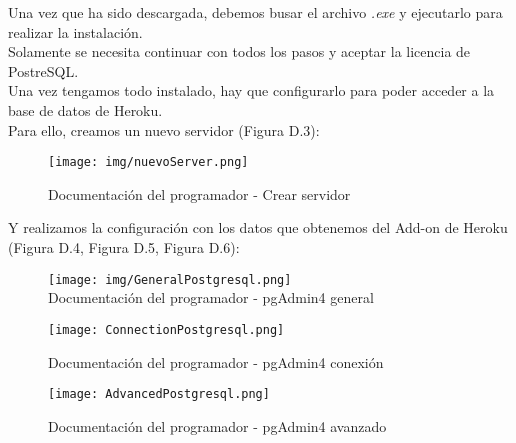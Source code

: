 Una vez que ha sido descargada, debemos busar el archivo \textit{.exe} y ejecutarlo para realizar la instalación.\\
Solamente se necesita continuar con todos los pasos y aceptar la licencia de PostreSQL.\\
Una vez tengamos todo instalado, hay que configurarlo para poder acceder a la base de datos de Heroku.\\
Para ello, creamos un nuevo servidor (Figura D.3):
\begin{figure}[h!]
    \centering
    \texttt{[image: img/nuevoServer.png]}
    \caption{Documentación del programador - Crear servidor}
    \label{Documentación del programador - Crear servidor}
\end{figure}


Y realizamos la configuración con los datos que obtenemos del Add-on de Heroku (Figura D.4, Figura D.5, Figura D.6):\\
\begin{figure}[H]
    \hspace{0.2cm}
    \begin{minipage}[b]{0.3\linewidth}
        \centering
        \texttt{[image: img/GeneralPostgresql.png]} \\
        \caption{Documentación del programador - pgAdmin4 general}
        \label{Documentación del programador - pgAdmin4 general}
    \end{minipage}
    \hspace{0.2cm}
    \begin{minipage}[b]{0.3\linewidth}
        \centering
        \texttt{[image: ConnectionPostgresql.png]}
        \caption{Documentación del programador - pgAdmin4 conexión}
        \label{Documentación del programador - pgAdmin4 conexión}
    \end{minipage}
    \hspace{0.2cm}
    \begin{minipage}[b]{0.3\linewidth}
        \centering
        \texttt{[image: AdvancedPostgresql.png]}
        \caption{Documentación del programador - pgAdmin4 avanzado}
        \label{Documentación del programador - pgAdmin4 avanzado}
    \end{minipage}
\end{figure}
